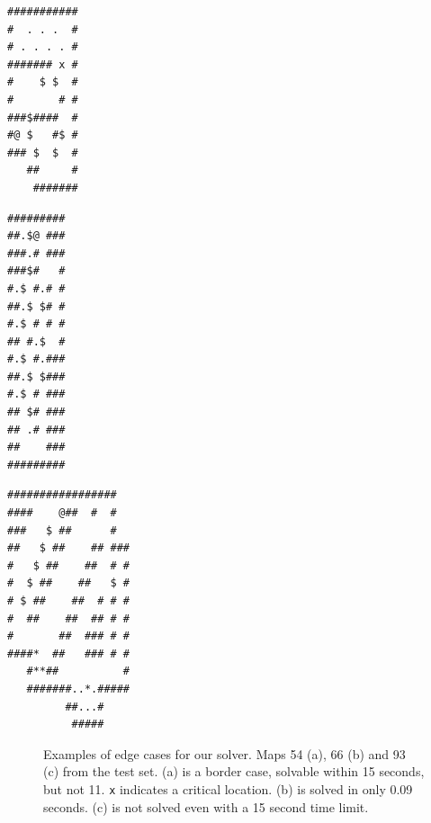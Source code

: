 \documentclass[a4paper,11pt]{article}
\begin{document}
\begin{lrbox}{\mapff}
  \begin{minipage}{.25\textwidth}
\centering
\begin{BVerbatim}
###########
#  . . .  #
# . . . . #
####### x #
#    $ $  #
#       # #
###$####  #
#@ $   #$ #
### $  $  #
   ##     #
    #######  
\end{BVerbatim}
  \end{minipage}
\end{lrbox}%

\begin{lrbox}{\mapss}
  \begin{minipage}{.25\textwidth}
\centering
\begin{BVerbatim}
#########
##.$@ ###
###.# ###
###$#   #
#.$ #.# #
##.$ $# #
#.$ # # #
## #.$  #
#.$ #.###
##.$ $###
#.$ # ###
## $# ###
## .# ###
##    ###
#########
\end{BVerbatim}
  \end{minipage}
\end{lrbox}%

\begin{lrbox}{\mapnt}
  \begin{minipage}{.25\textwidth}
\centering
\begin{BVerbatim}
#################  
####    @##  #  #  
###   $ ##      #  
##   $ ##    ## ###
#   $ ##    ##  # #
#  $ ##    ##   $ #
# $ ##    ##  # # #
#  ##    ##  ## # #
#       ##  ### # #
####*  ##   ### # #
   #**##          #
   #######..*.#####
         ##...#    
          #####
\end{BVerbatim}
  \end{minipage}
\end{lrbox}%


\begin{figure}
  \centering
  \subfloat[Unsolved]{\usebox{\mapnt}}
  \caption{Examples of edge cases for our solver. Maps 54 (a), 66 (b) and 93 (c) from the test set. (a) is a border case, solvable within 15 seconds, but not 11. \texttt{x} indicates a critical location. (b) is solved in only 0.09 seconds. (c) is not solved even with a 15 second time limit.}
\end{figure}
\end{document}

